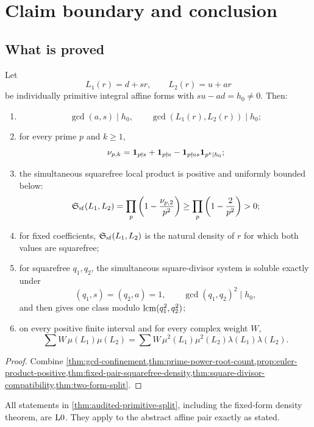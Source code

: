 \section{Claim boundary and conclusion}
\label{sec:claim-boundary}

\subsection{What is proved}

\begin{theorem}
\label{thm:audited-primitive-split}
Let
\[
 L_1(r)=d+sr,\qquad
 L_2(r)=u+ar
\]
be individually primitive integral affine forms with
\(su-ad=h_0\ne0\).  Then:
\begin{enumerate}[label=(\roman*),leftmargin=2.2em]
\item
\[
 \gcd(a,s)\mid h_0,\qquad
 \gcd(L_1(r),L_2(r))\mid h_0;
\]
\item for every prime \(p\) and \(k\ge1\),
\[
 \nu_{p,k}
 =
 \mathbf 1_{p\nmid s}+\mathbf 1_{p\nmid a}
 -\mathbf 1_{p\nmid as}\mathbf 1_{p^k\mid h_0};
\]
\item the simultaneous squarefree local product is positive and
uniformly bounded below:
\[
 \mathfrak S_{\mathrm{sf}}(L_1,L_2)
 =
 \prod_p\left(1-\frac{\nu_{p,2}}{p^2}\right)
 \ge
 \prod_p\left(1-\frac2{p^2}\right)>0;
\]
\item for fixed coefficients, \(\mathfrak S_{\mathrm{sf}}(L_1,L_2)\) is the natural
density of \(r\) for which both values are squarefree;
\item for squarefree \(q_1,q_2\), the simultaneous square-divisor
system is soluble exactly under
\[
 (q_1,s)=(q_2,a)=1,\qquad
 \gcd(q_1,q_2)^2\mid h_0,
\]
and then gives one class modulo
\(\operatorname{lcm}(q_1^2,q_2^2)\);
\item on every positive finite interval and for every complex
weight \(W\),
\[
 \sum W\,\mu(L_1)\mu(L_2)
 =
 \sum W\,\mu^2(L_1)\mu^2(L_2)
 \lambda(L_1)\lambda(L_2).
\]
\end{enumerate}
\end{theorem}

\begin{proof}
Combine
\cref{thm:gcd-confinement,thm:prime-power-root-count,prop:euler-product-positive,thm:fixed-pair-squarefree-density,thm:square-divisor-compatibility,thm:two-form-split}.
\end{proof}

All statements in \cref{thm:audited-primitive-split}, including the
fixed-form density theorem, are \(\mathrm{L0}\).  They apply to the
abstract affine pair exactly as stated.

